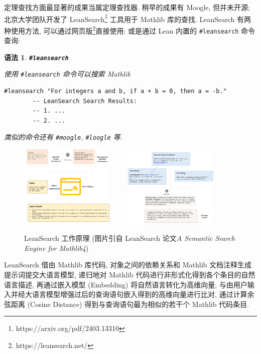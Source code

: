 \documentclass[UTF8]{ctexart}
\DeclareMathOperator{\0}{\mathbf{0}}                    %
\newcommand{\<}{\langle}
\renewcommand{\>}{\rangle}                              %
\newenvironment{thm_box}{
    \begin{tcolorbox}[enhanced, colback=thm_blue2, boxrule=0pt, frame hidden,
        borderline west={0.7mm}{0.1mm}{thm_blue1},breakable]
    }
    {\end{tcolorbox}}
\theoremstyle{MyStyle} %
\newtheorem{syntax}[definition]{语法}
\newenvironment{syn}[1]
{
    \begin{thm_box}
        \begin{syntax}
            \textbf{#1}
            \newline
}
{
        \end{syntax}
    \end{thm_box}
}
\newcommand*{\lean}[1]{\texttt{\color{blue}#1}}
\begin{document}
        定理查找方面最显著的成果当属定理查找器. 稍早的成果有 Moogle, 但并未开源; 北京大学团队开发了 LeanSearch\footnote{https://arxiv.org/pdf/2403.13310} 工具用于 Mathlib 库的查找. LeanSearch 有两种使用方法, 可以通过网页版\footnote{https://leansearch.net/}直接使用: 或是通过 Lean 内置的 \lean{\#leansearch} 命令查询: 

        \begin{syn}
            {\lean{\#leansearch}}
            使用 \lean{\#leansearch} 命令可以搜索 Mathlib 
            \begin{lstlisting}[style=lean]
    #leansearch "For integers a and b, if a + b = 0, then a = -b."
        -- LeanSearch Search Results: 
        -- 1. ...
        -- 2. ...
            \end{lstlisting}

            类似的命令还有 \lean{\#moogle}, \lean{\#loogle} 等. 
        \end{syn}
        
        \begin{figure}[htbp]
            \centering
            \includegraphics[width=0.4\textwidth]{figures/Leansearch1.png}\label{fig:LeanSearch1}
            $\qquad$
            \includegraphics[width=0.4\textwidth]{figures/Leansearch2.png}\label{fig:LeanSearch2}
            \caption{LeanSearch 工作原理 (图片引自 LeanSearch 论文\textit{A Semantic Search Engine for Mathlib4})}
        \end{figure}

        LeanSearch 借由 Mathlib 库代码, 对象之间的依赖关系和 Mathlib 文档注释生成提示词提交大语言模型, 递归地对 Mathlib 代码进行非形式化得到各个条目的自然语言描述, 再通过嵌入模型 (Embedding) 将自然语言转化为高维向量, 与由用户输入并经大语言模型增强过后的查询语句嵌入得到的高维向量进行比对, 通过计算余弦距离 (Cosine Distance) 得到与查询语句最为相似的若干个 Mathlib 代码条目. 
\end{document}
